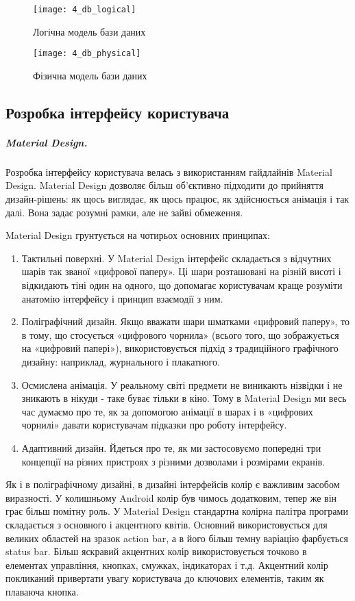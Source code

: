 \documentclass[../main.tex]{subfiles}
\begin{document}
\begin{figure}[H]
	\centering
	\texttt{[image: 4\_db\_logical]}
	\caption{Логічна модель бази даних}
\end{figure}

\begin{figure}[H]
	\centering
	\texttt{[image: 4\_db\_physical]}
	\caption{Фізична модель бази даних}
\end{figure}

\subsection{Розробка інтерфейсу користувача}

\subparagraph{Material Design.}

Розробка інтерфейсу користувача велась з використанням гайдлайнів Material Design.\cite{material_design} Material Design дозволяє більш об'єктивно підходити до прийняття дизайн-рішень: як щось виглядає, як щось працює, як здійснюється анімація і так далі. Вона задає розумні рамки, але не зайві обмеження.

Material Design грунтується на чотирьох основних принципах:
\begin{enumerate}
	\item Тактильні поверхні. У Material Design інтерфейс складається з відчутних шарів так званої «цифрової паперу». Ці шари розташовані на різній висоті і відкидають тіні один на одного, що допомагає користувачам краще розуміти анатомію інтерфейсу і принцип взаємодії з ним.
	\item Поліграфічний дизайн. Якщо вважати шари шматками «цифровий паперу», то в тому, що стосується «цифрового чорнила» (всього того, що зображується на «цифровий папері»), використовується підхід з традиційного графічного дизайну: наприклад, журнального і плакатного.
	\item Осмислена анімація. У реальному світі предмети не виникають нізвідки і не зникають в нікуди - таке буває тільки в кіно. Тому в Material Design ми весь час думаємо про те, як за допомогою анімації в шарах і в «цифрових чорнилі» давати користувачам підказки про роботу інтерфейсу.
	\item Адаптивний дизайн. Йдеться про те, як ми застосовуємо попередні три концепції на різних пристроях з різними дозволами і розмірами екранів.
\end{enumerate}

Як і в поліграфічному дизайні, в дизайні інтерфейсів колір є важливим засобом виразності. У колишньому Android колір був чимось додатковим, тепер же він грає більш помітну роль. У Material Design стандартна колірна палітра програми складається з основного і акцентного квітів. Основний використовується для великих областей на зразок action bar, а в його більш темну варіацію фарбується status bar. Більш яскравий акцентних колір використовується точково в елементах управління, кнопках, смужках, індикаторах і т.д. Акцентний колір покликаний привертати увагу користувача до ключових елементів, таким як плаваюча кнопка.
\end{document}
